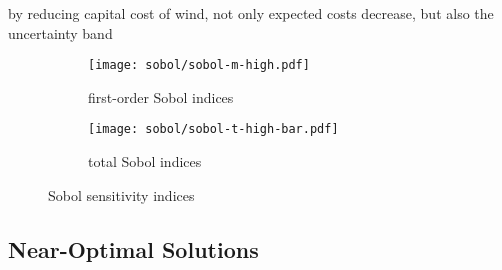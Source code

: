 by reducing capital cost of wind, not only expected costs decrease, but also the uncertainty band


\begin{figure}
    \begin{subfigure}[t]{0.45\textwidth}
        \caption{first-order Sobol indices}
        \texttt{[image: sobol/sobol-m-high.pdf]}
    \end{subfigure}
    \begin{subfigure}[t]{0.54\textwidth}
        \caption{total Sobol indices}
        \texttt{[image: sobol/sobol-t-high-bar.pdf]}
    \end{subfigure}
    \caption{Sobol sensitivity indices}
\end{figure}

\subsection{Near-Optimal Solutions}


